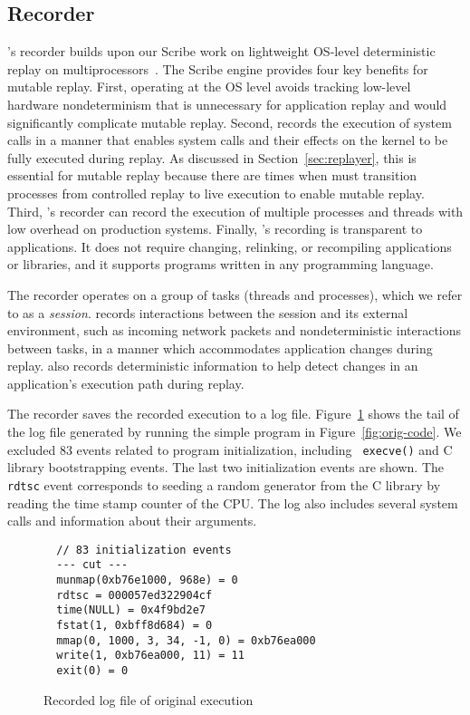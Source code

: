 \subsection{Recorder}
\label{sec:recorder}

{\dora}'s recorder builds upon our Scribe work on lightweight OS-level
deterministic replay on multiprocessors~\cite{scribe:sigmetrics10}.
The Scribe engine provides four key benefits for mutable replay. First, operating
at the OS level avoids tracking low-level hardware nondeterminism that
is unnecessary for application replay and would significantly
complicate mutable replay.  Second, {\dora} records the execution
of system calls in a manner that enables system calls and their effects
on the kernel to be fully executed during replay.  As discussed in
Section~\ref{sec:replayer}, this is essential for mutable replay
because there are times when {\dora} must transition processes
from controlled replay to live execution to enable mutable replay.
Third, {\dora}'s recorder can record the execution of multiple
processes and threads with low overhead on production systems. Finally,
{\dora}'s recording is transparent to applications.  It does not
require changing, relinking, or recompiling applications or libraries,
and it supports programs written in any programming language.

The recorder operates on a group of tasks (threads and processes), which we
refer to as a {\em session}. {\dora} records interactions between the
session and its external environment, such as incoming network packets and
nondeterministic interactions between tasks, in a manner which accommodates
application changes during replay. {\dora} also records deterministic
information to help detect changes in an application's execution path during
replay.

The recorder saves the recorded execution to a log file.
Figure~\ref{fig:example-orig-log} shows the
tail of the log file generated by running the simple program in
Figure~\ref{fig:orig-code}. We excluded 83 events related to program initialization, including {\tt
execve()} and C library bootstrapping events. The last two initialization events
are shown. The {\tt rdtsc} event corresponds to seeding a random generator from the C library
by reading the time stamp counter of the CPU. The log also includes
several system calls and information about their arguments.

\begin{figure}
\begin{center}
\begin{footnotesize}
\begin{verbatim}
  // 83 initialization events
  --- cut ---
  munmap(0xb76e1000, 968e) = 0
  rdtsc = 000057ed322904cf
  time(NULL) = 0x4f9bd2e7
  fstat(1, 0xbff8d684) = 0
  mmap(0, 1000, 3, 34, -1, 0) = 0xb76ea000
  write(1, 0xb76ea000, 11) = 11
  exit(0) = 0
\end{verbatim}
\end{footnotesize}
\end{center}
\caption{Recorded log file of original execution}
\label{fig:example-orig-log}
\end{figure}

